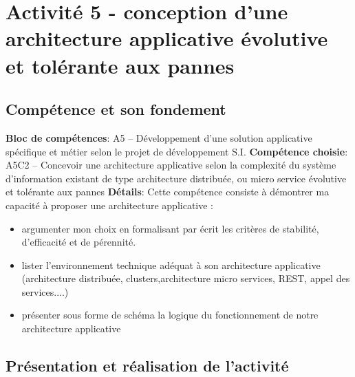 \documentclass[a4paper, 11pt]{report}
\begin{document}
\section{Activité 5 - conception d'une architecture applicative évolutive et tolérante aux pannes}
\subsection{Compétence et son fondement}
\textbf{Bloc de compétences}: A5 – Développement d’une solution applicative spécifique et métier selon le projet de développement S.I.
\newline
\textbf{Compétence choisie}: A5C2 – Concevoir une architecture applicative selon la complexité du système d’information existant de type architecture distribuée, ou micro service évolutive et tolérante aux pannes
\newline
\textbf{Détails}: Cette compétence consiste à démontrer ma capacité à proposer une architecture applicative :
\begin{itemize}
  \item argumenter mon choix en formalisant par écrit les critères de stabilité, d’efficacité et
de pérennité.
  \item lister l’environnement technique adéquat à son architecture applicative (architecture distribuée, clusters,architecture micro services, REST, appel des services....)
  \item présenter sous forme de schéma la logique du fonctionnement de notre architecture applicative
\end{itemize}
\subsection{Présentation et réalisation de l'activité}
\end{document}
